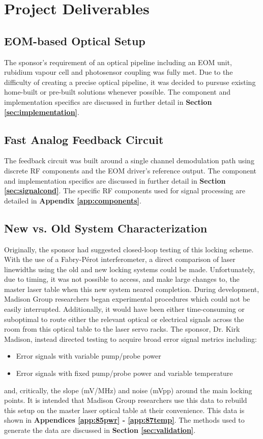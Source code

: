 \newpage
\section{Project Deliverables}

\subsection{EOM-based Optical Setup}

The sponsor's requirement of an optical pipeline including an EOM unit, rubidium vapour cell and photosensor coupling was fully met. Due to the difficulty of creating a precise optical pipeline, it was decided to pursuse existing home-built or pre-built solutions whenever possible. The component and implementation specifics are discussed in further detail in \textbf{Section \ref{sec:implementation}}.

\subsection{Fast Analog Feedback Circuit}

The feedback circuit was built around a single channel demodulation path using discrete RF components and the EOM driver's reference output. The component and implementation specifics are discussed in further detail in \textbf{Section \ref{sec:signalcond}}. The specific RF components used for signal processing are detailed in \textbf{Appendix \ref{app:components}}.

\subsection{New vs. Old System Characterization}

Originally, the sponsor had suggested closed-loop testing of this locking scheme. With the use of a Fabry-P{\'e}rot interferometer, a direct comparison of laser linewidths using the old and new locking systems could be made. Unfortunately, due to timing, it was not possible to access, and make large changes to, the master laser table when this new system neared completion. During development, Madison Group researchers began experimental procedures which could not be easily interrupted. Additionally, it would have been either time-consuming or suboptimal to route either the relevant optical or electrical signals across the room from this optical table to the laser servo racks. The sponsor, Dr. Kirk Madison, instead directed testing to acquire broad error signal metrics including:
\begin{itemize}
    \item Error signals with variable pump/probe power
    \item Error signals with fixed pump/probe power and variable temperature
\end{itemize}
and, critically, the slope (mV/MHz) and noise (mVpp) around the main locking points. It is intended that Madison Group researchers use this data to rebuild this setup on the master laser optical table at their convenience. This data is shown in \textbf{Appendices \ref{app:85pwr} - \ref{app:87temp}}. The methods used to generate the data are discussed in \textbf{Section \ref{sec:validation}}.